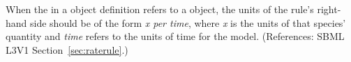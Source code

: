 When the  in a \RateRule object definition refers to a
\Species object, the units of the rule's right-hand side should be of the
form \emph{x per time}, where \emph{x} is the units of that species'
quantity and \emph{time} refers to the units of time for the model.
(References: SBML L3V1 Section~\ref{sec:raterule}.)

